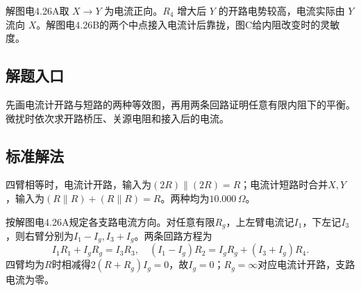 \documentclass[UTF8,fontset=fandol,a4paper,11pt]{ctexart}
\begin{document}
解图电4.26A取 $X\to Y$ 为电流正向。$R_4$ 增大后 $Y$ 的开路电势较高，电流实际由 $Y$ 流向 $X$。解图电4.26B的两个中点接入电流计后靠拢，图C给内阻改变时的灵敏度。



\subsection*{解题入口}

先画电流计开路与短路的两种等效图，再用两条回路证明任意有限内阻下的平衡。微扰时依次求开路桥压、关源电阻和接入后的电流。


\subsection*{标准解法}

四臂相等时，电流计开路，输入为$(2R)\parallel(2R)=R$；电流计短路时合并$X,Y$，输入为$(R\parallel R)+(R\parallel R)=R$。两种均为$10.000\,\Omega$。

按解图电4.26A规定各支路电流方向。对任意有限$R_g$，上左臂电流记$I_1$，下左记$I_3$，则右臂分别为$I_1-I_g,I_3+I_g$。两条回路方程为
\[
I_1R_1+I_gR_g=I_3R_3,\quad
(I_1-I_g)R_2=I_gR_g+(I_3+I_g)R_4.
\]
四臂均为$R$时相减得$2(R+R_g)I_g=0$，故$I_g=0$；$R_g=\infty$对应电流计开路，支路电流为零。
\end{document}
